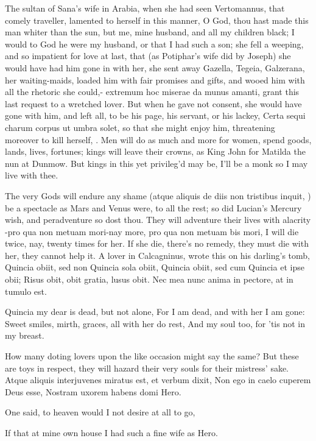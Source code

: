 The sultan of Sana's wife in Arabia, when she had seen Vertomannus,
that comely traveller, lamented to herself in this manner, O God,
thou hast made this man whiter than the sun, but me, mine husband, and
all my children black; I would to God he were my husband, or that I had
such a son; she fell a weeping, and so impatient for love at last, that
(as Potiphar's wife did by Joseph) she would have had him gone in with
her, she sent away Gazella, Tegeia, Galzerana, her waiting-maids,
loaded him with fair promises and gifts, and wooed him with all the
rhetoric she could,- extremum hoc miserae da munus amanti, grant this
last request to a wretched lover. But when he gave not consent, she
would have gone with him, and left all, to be his page, his servant, or
his lackey, Certa sequi charum corpus ut umbra solet, so that she might
enjoy him, threatening moreover to kill herself, \etc{}. Men will do as
much and more for women, spend goods, lands, lives, fortunes; kings
will leave their crowns, as King John for Matilda the nun at Dunmow.
But kings in this yet privileg'd may be,
I'll be a monk so I may live with thee.

The very Gods will endure any shame (atque aliquis de diis non
tristibus inquit, \etc{}) be a spectacle as Mars and Venus were, to all
the rest; so did Lucian's Mercury wish, and peradventure so dost thou.
They will adventure their lives with alacrity -pro qua non metuam
mori-nay more, pro qua non metuam bis mori, I will die twice, nay,
twenty times for her. If she die, there's no remedy, they must die with
her, they cannot help it. A lover in Calcagninus, wrote this on his
darling's tomb,
Quincia obiit, sed non Quincia sola obiit,
Quincia obiit, sed cum Quincia et ipse obii;
Risus obit, obit gratia, lusus obit.
Nec mea nunc anima in pectore, at in tumulo est.

Quincia my dear is dead, but not alone,
For I am dead, and with her I am gone:
Sweet smiles, mirth, graces, all with her do rest,
And my soul too, for 'tis not in my breast.

How many doting lovers upon the like occasion might say the same? But
these are toys in respect, they will hazard their very souls for their
mistress' sake.
Atque aliquis interjuvenes miratus est, et verbum dixit,
Non ego in caelo cuperem Deus esse,
Nostram uxorem habens domi Hero.


One said, to heaven would I not
desire at all to go,

If that at mine own house I had
such a fine wife as Hero.

